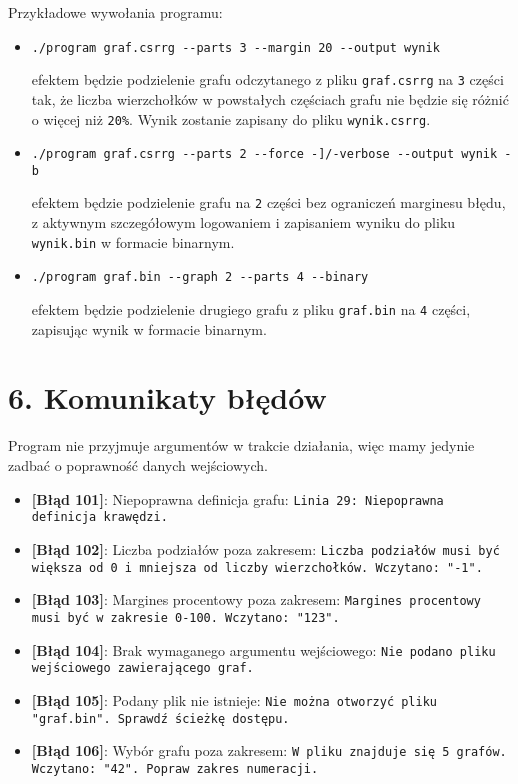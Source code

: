 \documentclass[]{article}
\begin{document}
Przykładowe wywołania programu:

\begin{itemize}
\item
\texttt{./program graf.csrrg -\/-parts 3 -\/-margin 20 -\/-output wynik}

efektem będzie podzielenie grafu odczytanego z pliku \texttt{graf.csrrg} na \texttt{3} części tak, że liczba wierzchołków w powstałych częściach grafu nie będzie się różnić o więcej niż \texttt{20\%}. Wynik zostanie zapisany do pliku \texttt{wynik.csrrg}.
\item
\texttt{./program graf.csrrg -\/-parts 2 -\/-force -]/-verbose -\/-output wynik -b}

efektem będzie podzielenie grafu na \texttt{2} części bez ograniczeń marginesu błędu, z aktywnym szczegółowym logowaniem i zapisaniem wyniku do pliku \texttt{wynik.bin} w formacie binarnym.
\item
\texttt{./program graf.bin -\/-graph 2 -\/-parts 4 -\/-binary}

efektem będzie podzielenie drugiego grafu z pliku \texttt{graf.bin} na \texttt{4} części, zapisując wynik w formacie binarnym.
\end{itemize}



\section{6. Komunikaty błędów}

Program nie przyjmuje argumentów w trakcie działania, więc mamy jedynie zadbać o poprawność danych wejściowych.

\begin{itemize}
\item
\textbf{[Błąd 101]}: Niepoprawna definicja grafu: \texttt{Linia 29: Niepoprawna definicja krawędzi.}
\item
\textbf{[Błąd 102]}: Liczba podziałów poza zakresem: \texttt{Liczba podziałów musi być większa od 0 i mniejsza od liczby wierzchołków. Wczytano: "-1".}
\item
\textbf{[Błąd 103]}: Margines procentowy poza zakresem: \texttt{Margines procentowy musi być w zakresie 0-100. Wczytano: "123".}

\item
\textbf{[Błąd 104]}: Brak wymaganego argumentu wejściowego: \texttt{Nie podano pliku wejściowego zawierającego graf.}
\item
\textbf{[Błąd 105]}: Podany plik nie istnieje: \texttt{Nie można otworzyć pliku "graf.bin". Sprawdź ścieżkę dostępu.}
\item
\textbf{[Błąd 106]}: Wybór grafu poza zakresem: \texttt{W pliku znajduje się 5 grafów. Wczytano: "42". Popraw zakres numeracji.}
\end{itemize}
\end{document}
